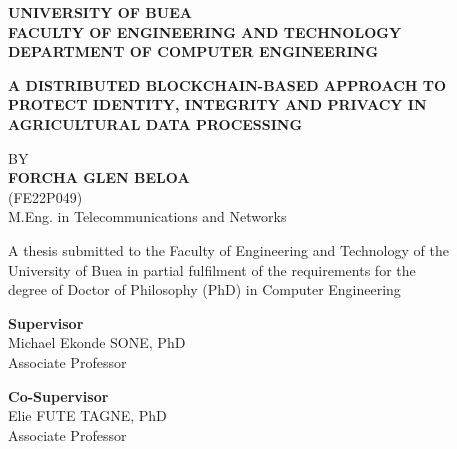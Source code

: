 \documentclass[12pt,a4paper,oneside]{book}
\begin{document}
\clearpage\thispagestyle{empty}\mbox{}   \clearpage
\thispagestyle{empty}
\begin{center}
\begin{singlespace}

{\fontsize{14}{17}\selectfont\bfseries UNIVERSITY OF BUEA}\\[0.4\baselineskip]
{\fontsize{14}{17}\selectfont\bfseries FACULTY OF ENGINEERING AND TECHNOLOGY}\\[0.3\baselineskip]
{\fontsize{14}{17}\selectfont\bfseries DEPARTMENT OF COMPUTER ENGINEERING}

\vspace{2.5\baselineskip}

{\fontsize{16}{19}\selectfont\bfseries
A DISTRIBUTED BLOCKCHAIN-BASED APPROACH TO PROTECT IDENTITY,
INTEGRITY AND PRIVACY IN AGRICULTURAL DATA PROCESSING}

\vspace{2.5\baselineskip}

{\fontsize{14}{17}\selectfont BY}\\[0.4\baselineskip]
{\fontsize{14}{17}\selectfont\bfseries FORCHA GLEN BELOA}\\[0.3\baselineskip]
{\fontsize{12}{14}\selectfont (FE22P049)}\\
{\fontsize{12}{14}\selectfont M.Eng. in Telecommunications and Networks}

\vspace{2\baselineskip}

{\fontsize{12}{14}\selectfont
A thesis submitted to the Faculty of Engineering and Technology of the\\
University of Buea in partial fulfilment of the requirements for the\\
degree of Doctor of Philosophy (PhD) in Computer Engineering}

\vspace{2.5\baselineskip}

{\fontsize{14}{17}\selectfont\bfseries Supervisor}\\[0.3\baselineskip]
{\fontsize{12}{14}\selectfont Michael Ekonde SONE, PhD\\ Associate Professor}

\vspace{1.2\baselineskip}

{\fontsize{14}{17}\selectfont\bfseries Co-Supervisor}\\[0.3\baselineskip]
{\fontsize{12}{14}\selectfont Elie FUTE TAGNE, PhD\\ Associate Professor}

\vfill

{\fontsize{14}{17}\selectfont\bfseries \monthyear}

\end{singlespace}
\end{center}
\clearpage
 
\end{document}
